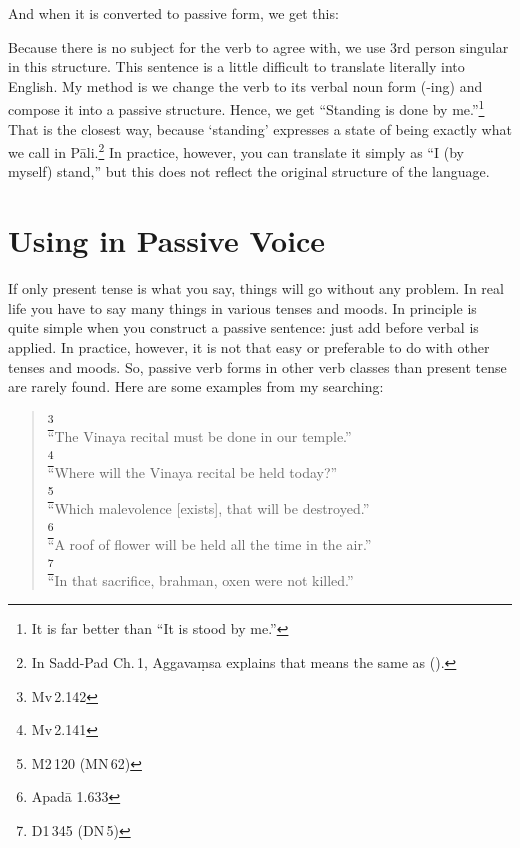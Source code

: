 
And when it is converted to passive form, we get this:


Because there is no subject for the verb to agree with, we use 3rd person singular in this structure. This sentence is a little difficult to translate literally into English. My method is we change the verb to its verbal noun form (-ing) and compose it into a passive structure. Hence, we get ``Standing is done by me.''\footnote{It is far better than ``It is stood by me.''} That is the closest way, because `standing' expresses a state of being exactly what we call  in P\=ali.\footnote{In Sadd-Pad Ch.\,1, Aggava\d msa explains that  means the same as  ().} In practice, however, you can translate it simply as ``I (by myself) stand,'' but this does not reflect the original structure of the language.

{}
\section*{Using  in Passive Voice}

If only present tense is what you say, things will go without any problem. In real life you have to say many things in various tenses and moods. In principle is quite simple when you construct a passive sentence: just add  before verbal  is applied. In practice, however, it is not that easy or preferable to do with other tenses and moods. So, passive verb forms in other verb classes than present tense are rarely found. Here are some examples from my searching:

\begin{quote}
\footnote{Mv\,2.142}\\
``The Vinaya recital must be done in our temple.''\\[1.5mm]
\footnote{Mv\,2.141}\\
``Where will the Vinaya recital be held today?''\\[1.5mm]
\footnote{M2\,120 (MN\,62)}\\
``Which malevolence [exists], that will be destroyed.''\\[1.5mm]
\footnote{Apad\=a 1.633}\\
``A roof of flower will be held all the time in the air.''\\[1.5mm]
\footnote{D1\,345 (DN\,5)}\\
``In that sacrifice, brahman, oxen were not killed.''\\
\end{quote}

